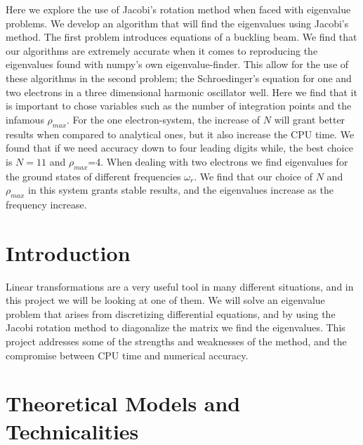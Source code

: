 \documentclass{article}
\begin{document}
Here we explore the use of Jacobi's rotation method when faced with eigenvalue problems. We develop an algorithm that will find the eigenvalues using Jacobi's method. The first problem introduces equations of a buckling beam. We find that our algorithms are extremely accurate when it comes to reproducing the eigenvalues found with numpy's own eigenvalue-finder.  This allow for the use of these algorithms in the second problem; the Schroedinger's equation for one and two electrons in a three dimensional harmonic oscillator well. Here we find that it is important to chose variables such as the number of integration points and the infamous $\rho_{max}$. For the one electron-system, the increase of $N$ will grant better results when compared to analytical ones, but it also increase the CPU time. We found that if we need accuracy down to four leading digits while, the best choice is $N=11$ and $\rho_{max}$=4. When dealing with two electrons we find eigenvalues for the ground states of different frequencies $\omega_r$. We find that our choice of $N$ and $\rho_{max}$ in this system grants stable results, and the eigenvalues increase as the frequency increase.

\section{Introduction}

Linear transformations are a very useful tool in many different situations, and in this project we will be looking at one of them. We will solve an eigenvalue problem that arises from discretizing differential equations, and by using the Jacobi rotation method to diagonalize the matrix we find the eigenvalues. This project addresses some of the strengths and weaknesses of the method, and the compromise between CPU time and numerical accuracy.



\section{Theoretical Models and Technicalities}
\end{document}
